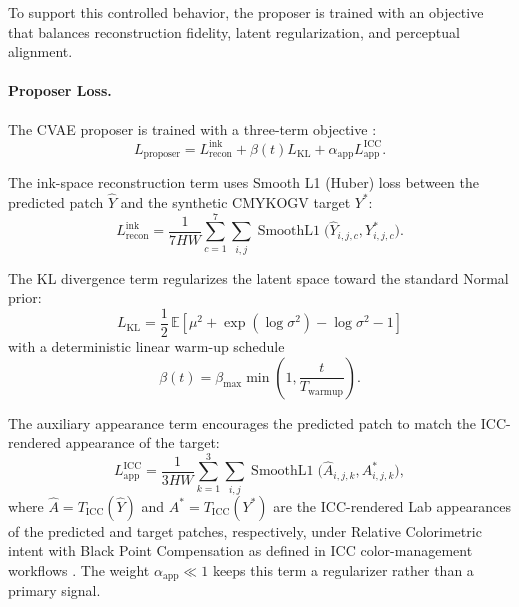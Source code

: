 \documentclass[acmsmall,screen,nonacm]{acmart}
\begin{document}
To support this controlled behavior, the proposer is trained with an objective that balances reconstruction fidelity, latent regularization, and perceptual alignment.

\paragraph{Proposer Loss.}

The CVAE proposer is trained with a three-term objective \cite{bo}:
\[
L_{\text{proposer}} = L^{\text{ink}}_{\text{recon}} + \beta(t) L_{\text{KL}} + \alpha_{\text{app}} L^{\text{ICC}}_{\text{app}}.
\]

The ink-space reconstruction term uses Smooth L1 (Huber) loss between the predicted patch $\hat{Y}$ and the synthetic CMYKOGV target $Y^*$:
\[
L^{\text{ink}}_{\text{recon}} =
\frac{1}{7HW}\sum_{c=1}^{7}\sum_{i,j}
\operatorname{SmoothL1}\!\bigl(\hat{Y}_{i,j,c}, Y^*_{i,j,c}\bigr).
\]

The KL divergence term regularizes the latent space toward the standard Normal prior:
\[
L_{\text{KL}} =
\frac{1}{2}\,\mathbb{E}\!\left[\mu^2 + \exp(\log \sigma^2) - \log \sigma^2 - 1\right]
\]
with a deterministic linear warm-up schedule
\[
\beta(t) = \beta_{\max}\min\!\left(1, \frac{t}{T_{\text{warmup}}}\right).
\]

The auxiliary appearance term encourages the predicted patch to match the ICC-rendered appearance of the target:
\[
L^{\text{ICC}}_{\text{app}} =
\frac{1}{3HW}\sum_{k=1}^{3}\sum_{i,j}
\operatorname{SmoothL1}\!\bigl(\hat{A}_{i,j,k}, A^*_{i,j,k}\bigr),
\]
where $\hat{A} = T_{\text{ICC}}(\hat{Y})$ and $A^* = T_{\text{ICC}}(Y^*)$ are the ICC-rendered Lab appearances of the predicted and target patches, respectively, under Relative Colorimetric intent with Black Point Compensation as defined in ICC color-management workflows \cite{icc}. The weight $\alpha_{\text{app}} \ll 1$ keeps this term a regularizer rather than a primary signal.
\end{document}
